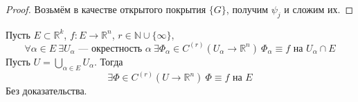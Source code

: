 \documentclass{article}
\begin{document}
    \begin{proof}
        Возьмём в качестве открытого покрытия $\{G\}$, получим $\psi_j$ и сложим их.
    \end{proof}
    \begin{theorem}
        \label{Равносильность существования локального и глобального гладкого продолжения}
        Пусть $E\subset\mathbb R^k$, $f\colon E\to\mathbb R^n$, $r\in\mathbb N\cup\{\infty\}$,
        $$
        \forall\alpha\in E~\exists U_\alpha\text{~--- окрестность }\alpha~\exists\Phi_\alpha\in C^{(r)}(U_\alpha\to\mathbb R^n)~\Phi_\alpha\equiv f\text{ на }U_\alpha\cap E
        $$
        Пусть $U=\bigcup\limits_{\alpha\in E}U_\alpha$. Тогда
        $$
        \exists\Phi\in C^{(r)}(U\to\mathbb R^n)~\Phi\equiv f\text{ на }E
        $$
        Без доказательства.
    \end{theorem}
\end{document}
